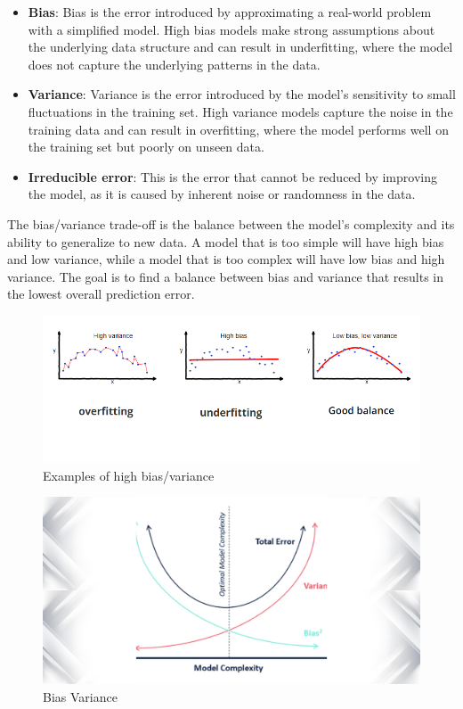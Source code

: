 \documentclass[12pt]{article}
\begin{document}
\begin{itemize}
\item \textbf{Bias}: Bias is the error introduced by approximating a real-world problem with a simplified model. High bias models make strong assumptions about the underlying data structure and can result in underfitting, where the model does not capture the underlying patterns in the data.
\item \textbf{Variance}: Variance is the error introduced by the model's sensitivity to small fluctuations in the training set. High variance models capture the noise in the training data and can result in overfitting, where the model performs well on the training set but poorly on unseen data.
\item \textbf{Irreducible error}: This is the error that cannot be reduced by improving the model, as it is caused by inherent noise or randomness in the data.
\end{itemize}
The bias/variance trade-off is the balance between the model's complexity and its ability to generalize to new data. A model that is too simple will have high bias and low variance, while a model that is too complex will have low bias and high variance. The goal is to find a balance between bias and variance that results in the lowest overall prediction error.

\begin{figure}[h]
    \centering
    \includegraphics[scale=0.5]{./media/bias_variance.png}
    \caption{Examples of high bias/variance}
    \label{fig:variance}
\end{figure}
\begin{figure}[h]
    \centering
    \includegraphics[scale=0.3]{./media/bias_graph.png}
    \caption{Bias Variance}
    \label{fig:bias}
\end{figure}
\end{document}
